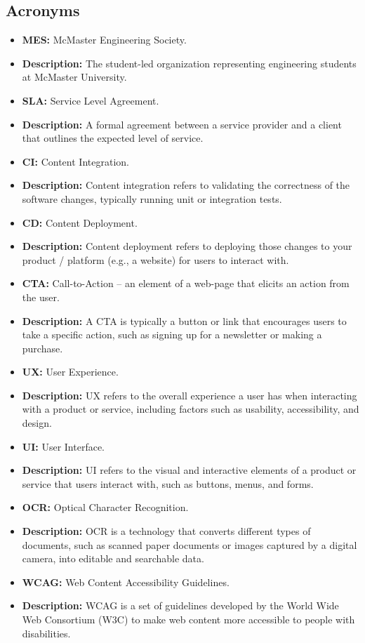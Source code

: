 \documentclass[12pt]{article}
\begin{document}
  \subsection{Acronyms}
    \begin{itemize}
      \item \textbf{MES:} McMaster Engineering Society.
        \item \textbf{Description:} The student-led organization representing engineering students at McMaster University.
      \item \textbf{SLA:} Service Level Agreement.
        \item \textbf{Description:} A formal agreement between a service provider and a client that outlines the expected level of service.
      \item \textbf{CI:} Content Integration.
        \item \textbf{Description:} Content integration refers to validating the correctness of the software changes, typically running unit or integration tests.
      \item \textbf{CD:} Content Deployment.
        \item \textbf{Description:} Content deployment refers to deploying those changes to your product / platform (e.g., a website) for users to interact with.
      \item \textbf{CTA:} Call-to-Action – an element of a web-page that elicits an action from the user.
        \item \textbf{Description:} A CTA is typically a button or link that encourages users to take a specific action, such as signing up for a newsletter or making a purchase.
      \item \textbf{UX:} User Experience.
        \item \textbf{Description:} UX refers to the overall experience a user has when interacting with a product or service, including factors such as usability, accessibility, and design.
      \item \textbf{UI:} User Interface.
        \item \textbf{Description:} UI refers to the visual and interactive elements of a product or service that users interact with, such as buttons, menus, and forms.
      \item \textbf{OCR:} Optical Character Recognition.
        \item \textbf{Description:} OCR is a technology that converts different types of documents, such as scanned paper documents or images captured by a digital camera, into editable and searchable data.
      \item \textbf{WCAG:} Web Content Accessibility Guidelines.
        \item \textbf{Description:} WCAG is a set of guidelines developed by the World Wide Web Consortium (W3C) to make web content more accessible to people with disabilities.
      \end{itemize}
\end{document}
